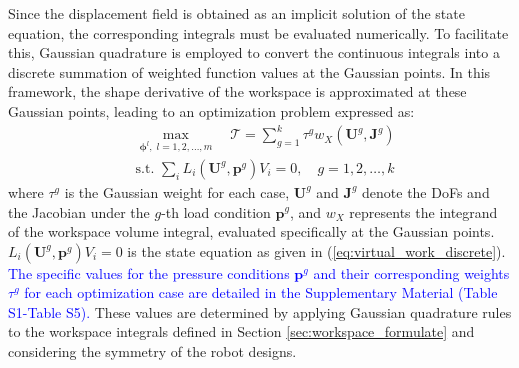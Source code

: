 \documentclass[journal]{IEEEtran}
\theoremstyle{definition}
\begin{document}
Since the displacement field is obtained as an implicit solution of the state equation, the corresponding integrals must be evaluated numerically. To facilitate this, Gaussian quadrature is employed to convert the continuous integrals into a discrete summation of weighted function values at the Gaussian points. In this framework, the shape derivative of the workspace is approximated at these Gaussian points, leading to an optimization problem expressed as:
\begin{equation}
  \begin{aligned}
    &\max_{\boldsymbol{\phi}^l,\; l=1,2,\dots,m} \quad \mathcal{T} = \sum_{g=1}^k \tau^g w_{X}\left(\mathbf{U}^g, \mathbf{J}^g\right)\\[1mm]
    &\text{s.t. } \sum_{i}L_i\left(\mathbf{U}^g, \mathbf{p}^g\right)V_i = 0,\quad g=1,2,\dots,k
  \end{aligned}
  \label{eq:optimization_problem}
\end{equation}
where $\tau^g$ is the Gaussian weight for each case, \(\mathbf{U}^g\) and $\mathbf{J}^g$ denote the DoFs and the Jacobian under the $g$-th load condition $\mathbf{p}^g$, and $w_X$ represents the integrand of the workspace volume integral, evaluated specifically at the Gaussian points. $L_i\left(\mathbf{U}^g,\mathbf{p}^g\right) V_i=0$ is the state equation as given in (\ref{eq:virtual_work_discrete}). \textcolor{blue}{The specific values for the pressure conditions $\mathbf{p}^g$ and their corresponding weights $\tau^g$ for each optimization case are detailed in the Supplementary Material (Table S1-Table S5).} These values are determined by applying Gaussian quadrature rules to the workspace integrals defined in Section \ref{sec:workspace_formulate} and considering the symmetry of the robot designs.
\end{document}
